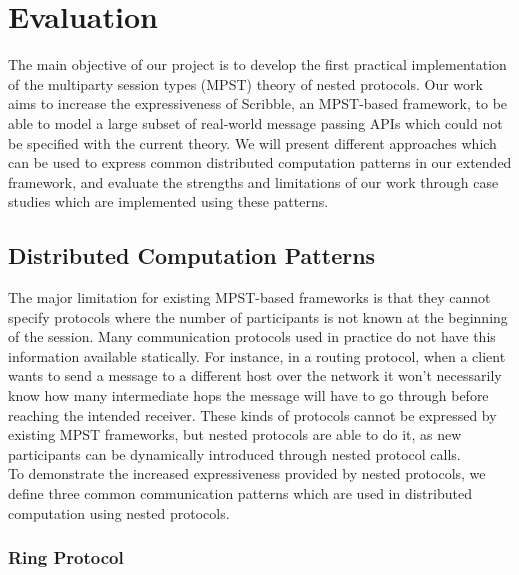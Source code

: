 \documentclass[12pt,twoside]{report}
\begin{document}


\chapter{Evaluation}\label{evaluation}
The main objective of our project is to develop the first practical implementation of the multiparty session types (MPST) theory of nested protocols. Our work aims to increase the expressiveness of Scribble\cite{scribble}, an MPST-based framework, to be able to model a large subset of real-world message passing APIs which could not be specified with the current theory. We will present different approaches which can be used to express common distributed computation patterns in our extended framework, and evaluate the strengths and limitations of our work through case studies which are implemented using these patterns.

\section{Distributed Computation Patterns}
The major limitation for existing MPST-based frameworks is that they cannot specify protocols where the number of participants is not known at the beginning of the session\cite{parametrictypes}. Many communication protocols used in practice do not have this information available statically. For instance, in a routing protocol, when a client wants to send a message to a different host over the network it won't necessarily know how many intermediate hops the message will have to go through before reaching the intended receiver. These kinds of protocols cannot be expressed by existing MPST frameworks, but nested protocols are able to do it, as new participants can be dynamically introduced through nested protocol calls.\\

To demonstrate the increased expressiveness provided by nested protocols, we define three common communication patterns which are used in distributed computation using nested protocols.

\subsection{Ring Protocol}\label{ring}
\end{document}
